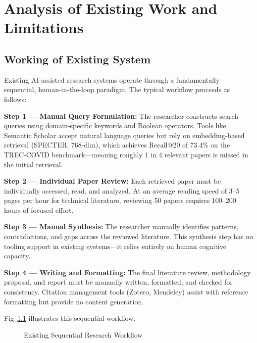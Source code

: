 \chapter{Analysis of Existing Work and Limitations}

\section{Working of Existing System}

Existing AI-assisted research systems operate through a fundamentally sequential, human-in-the-loop paradigm. The typical workflow proceeds as follows:

\textbf{Step 1 --- Manual Query Formulation:} The researcher constructs search queries using domain-specific keywords and Boolean operators. Tools like Semantic Scholar accept natural language queries but rely on embedding-based retrieval (SPECTER, 768-dim), which achieves Recall@20 of 73.4\% on the TREC-COVID benchmark---meaning roughly 1 in 4 relevant papers is missed in the initial retrieval.

\textbf{Step 2 --- Individual Paper Review:} Each retrieved paper must be individually accessed, read, and analyzed. At an average reading speed of 3--5 pages per hour for technical literature, reviewing 50 papers requires 100--200 hours of focused effort.

\textbf{Step 3 --- Manual Synthesis:} The researcher manually identifies patterns, contradictions, and gaps across the reviewed literature. This synthesis step has no tooling support in existing systems---it relies entirely on human cognitive capacity.

\textbf{Step 4 --- Writing and Formatting:} The final literature review, methodology proposal, and report must be manually written, formatted, and checked for consistency. Citation management tools (Zotero, Mendeley) assist with reference formatting but provide no content generation.

Fig~\ref{fig:existing_workflow} illustrates this sequential workflow.

\begin{figure}[H]
\centering
{}
\caption{Existing Sequential Research Workflow}
\label{fig:existing_workflow}
\end{figure}

